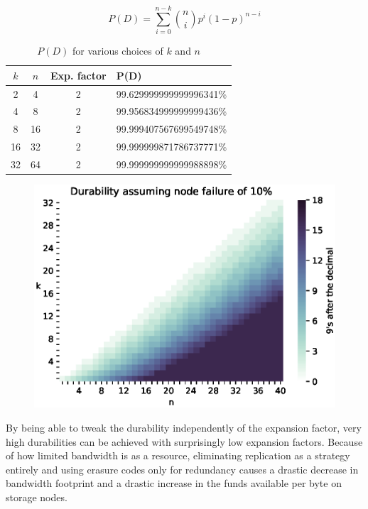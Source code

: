 \documentclass[a4paper,10pt]{article}
\begin{document}
\begin{equation}
P(D) = \sum_{i=0}^{n-k} \binom{n}{i} p^i (1-p)^{n-i}\label{eq:binom_cdf}
\end{equation}

\begin{table}[b]
	\centering
\begin{tabular}{c c c l}
$k$ & $n$ & Exp. factor & P(D) \\
\hline
2 & 4 & 2 & 99.629999999999996341\%\\
4 & 8 & 2 & 99.956834999999999436\%\\
8 & 16 & 2 & 99.999407567699549748\%\\
16 & 32 & 2 & 99.999999871786737771\%\\
32 & 64 & 2 & 99.999999999999988898\%\\
\end{tabular}
\caption{$P(D)$ for various choices of $k$ and $n$}
\end{table}

\begin{figure}
	\centering
\includegraphics[width=\linewidth]{durability/durability.eps}
\end{figure}


By being able to tweak the durability independently of the expansion
factor, very high durabilities can be achieved with surprisingly low expansion
factors. Because of how limited bandwidth is as a resource, eliminating
replication as a strategy entirely and using erasure codes only for redundancy
causes a drastic decrease in bandwidth footprint and a drastic increase in the
funds available per byte on storage nodes.
\end{document}
